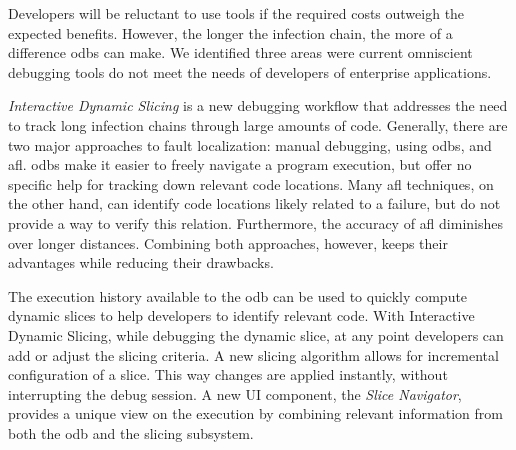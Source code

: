 \noindent
Developers will be reluctant to use tools if the required costs outweigh the expected benefits.
However, the longer the infection chain, the more of a difference \acfp{odb} can make.
We identified three areas were current omniscient debugging tools do not meet the needs of developers of enterprise applications.




\bigskip\noindent
\emph{Interactive Dynamic Slicing} is a new debugging workflow that addresses the need to track long infection chains through large amounts of code.
Generally, there are two major approaches to fault localization: manual debugging, \eg using \acp{odb}, and \acf{afl}.
\Acp{odb} make it easier to freely navigate a program execution, but offer no specific help for tracking down relevant code locations.
Many \ac{afl} techniques, on the other hand, can identify code locations likely related to a failure, but do not provide a way to verify this relation.
Furthermore, the accuracy of \ac{afl} diminishes over longer distances.
Combining both approaches, however, keeps their advantages while reducing their drawbacks.

The execution history available to the \ac{odb} can be used to quickly compute dynamic slices to help developers to identify relevant code.
With Interactive Dynamic Slicing, while debugging the dynamic slice, at any point developers can add or adjust the slicing criteria.
A new slicing algorithm allows for incremental configuration of a slice. 
This way changes are applied instantly, without interrupting the debug session. 
A new UI component, the \emph{Slice Navigator}, provides a unique view on the execution by combining relevant information from both the \ac{odb} and the slicing subsystem.

\bigskip\noindent

